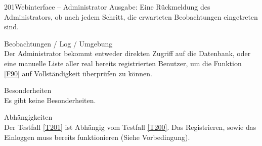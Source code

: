 \begin{testcase}{201}{Webinterface -- Administrator}
Ausgabe:
Eine Rückmeldung des Administrators, ob nach jedem Schritt, die erwarteten Beobachtungen eingetreten sind.
\item[Beobachtungen / Log / Umgebung]~\\
Der Administrator bekommt entweder direkten Zugriff auf die Datenbank, 
oder eine manuelle Liste aller real bereits registrierten Benutzer, um die Funktion \ref{F90} auf Vollständigkeit überprüfen zu können.
\item[Besonderheiten]~\\
Es gibt keine Besonderheiten.
\item[Abhängigkeiten]~\\
Der Testfall \ref{T201} ist Abhängig vom Testfall \ref{T200}. Das Registrieren, sowie das Einloggen muss bereits funktionieren (Siehe Vorbedingung).
\end{testcase}
